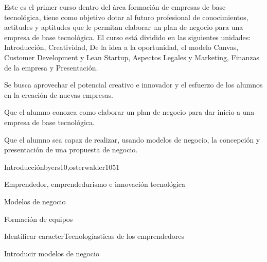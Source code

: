 \begin{syllabus}


\begin{justification}
Este es el primer curso dentro del área formación de empresas de
base tecnológica, tiene como objetivo dotar al futuro profesional 
de conocimientos, actitudes y aptitudes que le
permitan elaborar un plan de negocio para una empresa de base tecnológica.
El curso está dividido en las siguientes unidades:
Introducción, Creatividad, De la idea a la oportunidad, el modelo Canvas, Customer Development y Lean Startup, Aspectos Legales y Marketing, Finanzas de la empresa y Presentación.

Se busca aprovechar el potencial creativo e innovador y el esfuerzo de los alumnos en la creación de nuevas empresas.
\end{justification}

\begin{goals}
\item Que el alumno conozca como elaborar un plan de negocio para dar inicio a una empresa de base tecnológica.
\item Que el alumno sea capaz de realizar, usando modelos de negocio, la concepción y presentación de una propuesta de negocio.
\end{goals}

\begin{outcomes}
\end{outcomes}

\begin{unit}{Introducción}{byers10,osterwalder10}{5}{1}
\begin{topics}
      \item Emprendedor, emprendedurismo e innovación tecnológica
      \item Modelos de negocio
      \item Formación de equipos
   \end{topics}

   \begin{unitgoals}
      \item Identificar caracterTecnologíasticas de los emprendedores
      \item Introducir modelos de negocio 
   \end{unitgoals}
\end{unit}


\end{syllabus}
